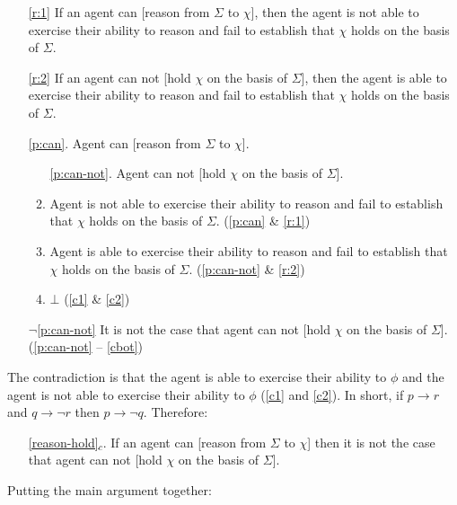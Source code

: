 \documentclass[10pt]{article}
\newcommand{\hozlinedash}[0]{%
  \noindent\hdashrule[0.5ex][c]{\textwidth}{.1pt}{2.5pt}
}
\begin{document}
\begin{enumerate}
\item[\ref{r:1}] If an agent can [reason from \(\Sigma\) to \(\chi\)], then the agent is not able to exercise their ability to reason and fail to establish that \(\chi\) holds on the basis of \(\Sigma\).
\item[\ref{r:2}] If an agent can not [hold \(\chi\) on the basis of \(\Sigma\)], then the agent is able to exercise their ability to reason and fail to establish that \(\chi\) holds on the basis of \(\Sigma\).
\item[\ref{p:can}.] Agent can [reason from \(\Sigma\) to \(\chi\)].
  \begin{enumerate}[ref=\alph*.]
  \item[\ref{p:can-not}.] Agent can not [hold \(\chi\) on the basis of \(\Sigma\)].
  \item\label{c1} Agent is not able to exercise their ability to reason and fail to establish that \(\chi\) holds on the basis of \(\Sigma\). \hfill (\ref{p:can} \& \ref{r:1})
  \item\label{c2} Agent is able to exercise their ability to reason and fail to establish that \(\chi\) holds on the basis of \(\Sigma\). \hfill (\ref{p:can-not} \& \ref{r:2})
  \item\label{cbot} \(\bot\) (\ref{c1} \& \ref{c2})
  \end{enumerate}
\item[\(\lnot\)\ref{p:can-not}] It is not the case that agent can not [hold \(\chi\) on the basis of \(\Sigma\)]. \hfill (\ref{p:can-not} -- \ref{cbot})
\end{enumerate}

The contradiction is that the agent is able to exercise their ability to \(\phi\) and the agent is not able to exercise their ability to \(\phi\) (\ref{c1} and \ref{c2}).
In short, if \(p \rightarrow r\) and \(q \rightarrow \lnot r\) then \(p \rightarrow \lnot q\).
Therefore:

\begin{itemize}
\item[\ref{reason-hold}\(_{c}\).] If an agent can [reason from \(\Sigma\) to \(\chi\)] then it is not the case that agent can not [hold \(\chi\) on the basis of \(\Sigma\)].
\end{itemize}

\hozlinedash

\newpage

Putting the main argument together:
\end{document}
